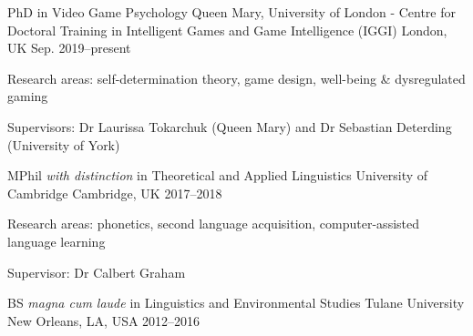 


\begin{cventries}


\cventry
{PhD in Video Game Psychology} %
{Queen Mary, University of London - Centre for Doctoral Training in Intelligent Games and Game Intelligence (IGGI)} %
{London, UK} %
{Sep. 2019--present} %
{ %
\begin{cvitems}
\item {Research areas: self-determination theory, game design, well-being \& dysregulated gaming}
\item{Supervisors: Dr Laurissa Tokarchuk (Queen Mary) and Dr Sebastian Deterding (University of York)}
\end{cvitems}
}


\cventry
{MPhil \textit{with distinction} in Theoretical and Applied Linguistics} %
{University of Cambridge} %
{Cambridge, UK} %
{2017--2018} %
{ %
\begin{cvitems}
\item {Research areas: phonetics, second language acquisition, computer-assisted language learning}
\item{Supervisor: Dr Calbert Graham}
\end{cvitems}
}


\cventry
{BS \textit{magna cum laude} in Linguistics and Environmental Studies} %
{Tulane University} %
{New Orleans, LA, USA} %
{2012--2016} %
{ %
}
\vspace{-4mm}



\end{cventries}